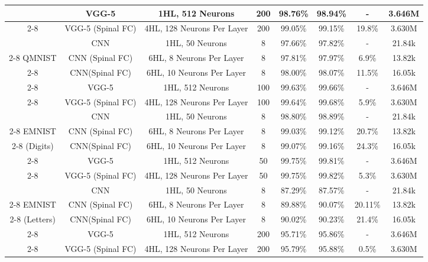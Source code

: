 \documentclass[journal]{IEEEtran}
\begin{document}
\begin{table*}
\begin{tabular}{|c|c|c|c|c|c|c|c|}
      & VGG-5\cite{VGG5} & 1HL, 512 Neurons &200 &98.76\%&98.94\%&- &3.646M\\ \cline{2-8}
      & VGG-5 (Spinal FC) & 4HL, 128 Neurons Per Layer &200 &99.05\%&99.15\%&19.8\% &3.630M\\ \hline \hline 



        & CNN\cite{MNIST_CNN}& 1HL, 50 Neurons &8 &97.66\%&97.82\%&-& 21.84k \\ \cline{2-8}
 QMNIST  & CNN (Spinal FC) & 6HL, 8 Neurons Per Layer &8 &97.81\%&97.97\%  & 6.9\%&13.82k\\ \cline{2-8}
   \cite{yadav2019cold}   & CNN(Spinal FC) & 6HL, 10 Neurons Per Layer &8 &98.00\%&98.07\% &11.5\%&16.05k\\ \cline{2-8}
     
      & VGG-5\cite{VGG5} & 1HL, 512 Neurons &100 &99.63\%&99.66\%&- &3.646M\\ \cline{2-8}
      & VGG-5 (Spinal FC) & 4HL, 128 Neurons Per Layer &100 &99.64\%&99.68\%&5.9\% &3.630M\\ \hline \hline 
      
              & CNN\cite{MNIST_CNN}& 1HL, 50 Neurons &8 &98.80\%&98.89\%&- & 21.84k\\ \cline{2-8}
 EMNIST  & CNN (Spinal FC) & 6HL, 8 Neurons Per Layer &8 &99.03\%&99.12\%  & 20.7\%&13.82k\\ \cline{2-8}
  (Digits) \cite{cohen2017emnist}   & CNN(Spinal FC) & 6HL, 10 Neurons Per Layer &8 &99.07\%&99.16\% &24.3\%&16.05k\\ \cline{2-8}
      
      & VGG-5\cite{VGG5} & 1HL, 512 Neurons &50 &99.75\%&99.81\%&- &3.646M\\ \cline{2-8}
      & VGG-5 (Spinal FC) & 4HL, 128 Neurons Per Layer & 50 &99.75\%&99.82\% & 5.3\% &3.630M\\ \hline \hline 
      
    & CNN\cite{MNIST_CNN}& 1HL, 50 Neurons &8 &87.29\%&87.57\%&- & 21.84k\\ \cline{2-8}
 EMNIST  & CNN (Spinal FC) & 6HL, 8 Neurons Per Layer &8 &89.88\%&90.07\%  & 20.11\%&13.82k\\ \cline{2-8}
  (Letters) \cite{cohen2017emnist}   & CNN(Spinal FC) & 6HL, 10 Neurons Per Layer &8 &90.02\%&90.23\% &21.4\%&16.05k\\ \cline{2-8}
     
      & VGG-5\cite{VGG5} & 1HL, 512 Neurons &200 &95.71\%&95.86\%&- &3.646M\\ \cline{2-8}
      & VGG-5 (Spinal FC) & 4HL, 128 Neurons Per Layer & 200 &95.79\%&95.88\% & 0.5\% &3.630M\\ \hline \hline 
      

\end{tabular}
\end{table*}
\end{document}
